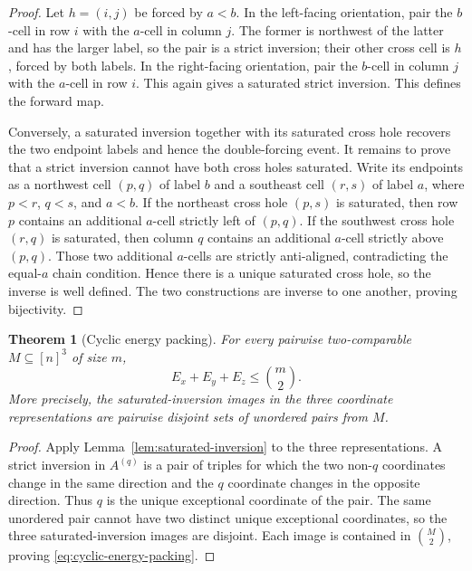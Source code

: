 \documentclass[11pt]{article}
\numberwithin{equation}{section}
\newtheorem{theorem}{Theorem}[section]
\theoremstyle{definition}
\theoremstyle{remark}
\begin{document}
\begin{proof}
Let $h=(i,j)$ be forced by $a<b$.  In the left-facing orientation, pair the
$b$-cell in row $i$ with the $a$-cell in column $j$.  The former is northwest
of the latter and has the larger label, so the pair is a strict inversion;
their other cross cell is $h$, forced by both labels.  In the right-facing
orientation, pair the $b$-cell in column $j$ with the $a$-cell in row $i$.
This again gives a saturated strict inversion.  This defines the forward map.

Conversely, a saturated inversion together with its saturated cross hole
recovers the two endpoint labels and hence the double-forcing event.  It
remains to prove that a strict inversion cannot have both cross holes
saturated.  Write its endpoints as a northwest cell $(p,q)$ of label $b$ and
a southeast cell $(r,s)$ of label $a$, where $p<r$, $q<s$, and $a<b$.
If the northeast cross hole $(p,s)$ is saturated, then row $p$ contains an
additional $a$-cell strictly left of $(p,q)$.  If the southwest cross hole
$(r,q)$ is saturated, then column $q$ contains an additional $a$-cell strictly
above $(p,q)$.  Those two additional $a$-cells are strictly anti-aligned,
contradicting the equal-$a$ chain condition.  Hence there is a unique
saturated cross hole, so the inverse is well defined.  The two constructions
are inverse to one another, proving bijectivity.
\end{proof}

\begin{theorem}[Cyclic energy packing]\label{thm:cyclic-energy-packing}
For every pairwise two-comparable $M\subseteq[n]^3$ of size $m$,
\begin{equation}\label{eq:cyclic-energy-packing}
 \boxed{E_x+E_y+E_z\le\binom m2.}
\end{equation}
More precisely, the saturated-inversion images in the three coordinate
representations are pairwise disjoint sets of unordered pairs from $M$.
\end{theorem}

\begin{proof}
Apply Lemma~\ref{lem:saturated-inversion} to the three representations.  A
strict inversion in $A^{(q)}$ is a pair of triples for which the two
non-$q$ coordinates change in the same direction and the $q$ coordinate
changes in the opposite direction.  Thus $q$ is the unique exceptional
coordinate of the pair.  The same unordered pair cannot have two distinct
unique exceptional coordinates, so the three saturated-inversion images are
disjoint.  Each image is contained in $\binom{M}{2}$, proving
\eqref{eq:cyclic-energy-packing}.
\end{proof}
\end{document}
